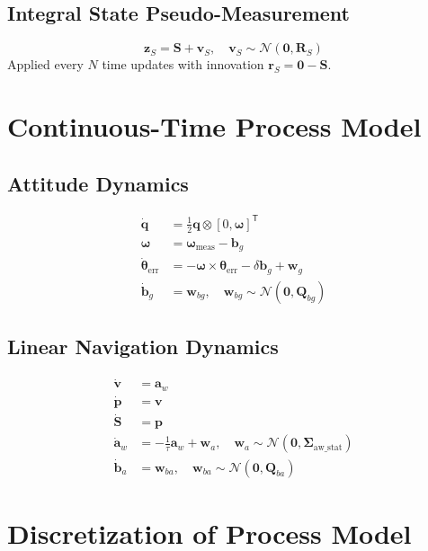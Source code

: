\documentclass{article}
\newcommand{\vect}[1]{\bm{#1}}
\newcommand{\quat}[1]{\mathbf{#1}}
\newcommand{\T}{\mathsf{T}}
\begin{document}
\subsection{Integral State Pseudo-Measurement}

\begin{equation}
\vect{z}_S = \vect{S} + \vect{v}_S, \quad \vect{v}_S \sim \mathcal{N}(\vect{0}, \vect{R}_S)
\end{equation}
Applied every $N$ time updates with innovation $\vect{r}_S = \vect{0} - \vect{S}$.

\section{Continuous-Time Process Model}

\subsection{Attitude Dynamics}

\begin{align}
\dot{\quat{q}} &= \frac{1}{2} \quat{q} \otimes [0, \vect{\omega}]^\T \\
\vect{\omega} &= \vect{\omega}_{\text{meas}} - \vect{b}_g \\
\dot{\vect{\theta}}_{\text{err}} &= -\vect{\omega} \times \vect{\theta}_{\text{err}} - \delta\vect{b}_g + \vect{w}_g \\
\dot{\vect{b}}_g &= \vect{w}_{bg}, \quad \vect{w}_{bg} \sim \mathcal{N}(\vect{0}, \vect{Q}_{bg})
\end{align}

\subsection{Linear Navigation Dynamics}

\begin{align}
\dot{\vect{v}} &= \vect{a}_w \\
\dot{\vect{p}} &= \vect{v} \\
\dot{\vect{S}} &= \vect{p} \\
\dot{\vect{a}}_w &= -\frac{1}{\tau}\vect{a}_w + \vect{w}_a, \quad \vect{w}_a \sim \mathcal{N}(\vect{0}, \vect{\Sigma}_{\text{aw\_stat}}) \\
\dot{\vect{b}}_a &= \vect{w}_{ba}, \quad \vect{w}_{ba} \sim \mathcal{N}(\vect{0}, \vect{Q}_{ba})
\end{align}

\section{Discretization of Process Model}
\end{document}
